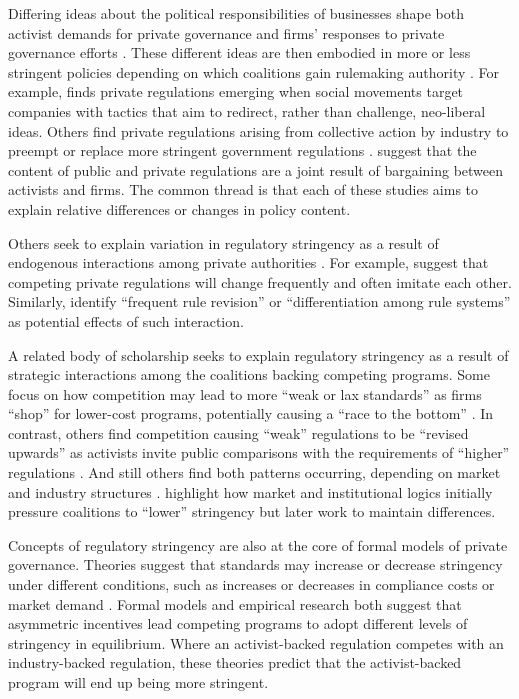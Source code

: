 \documentclass[
      12pt,
            Review ]{article}
\begin{document}
Differing ideas about the political responsibilities of businesses shape both activist demands for private governance and firms' responses to private governance efforts \citep{Bartley2003, Djelic2017}. These different ideas are then embodied in more or less stringent policies depending on which coalitions gain rulemaking authority \citep{Botzem2012, Hsueh2012}. For example, \citet{Bartley2003} finds private regulations emerging when social movements target companies with tactics that aim to redirect, rather than challenge, neo-liberal ideas. Others find private regulations arising from collective action by industry to preempt or replace more stringent government regulations \citep{Bartley2007, Cashore2002, Grabosky2013, Green2013, Loconto2014, Lyon2008, Maxwell2000, Prakash2000}. \citet{Abbott2009} suggest that the content of public and private regulations are a joint result of bargaining between activists and firms. The common thread is that each of these studies aims to explain relative differences or changes in policy content.

Others seek to explain variation in regulatory stringency as a result of endogenous interactions among private authorities \citep{DeLeon2009, Eberlein2014, Green2017, Gulbrandsen2014, Howard-Grenville2008, Li2015, Mills2016d}. For example, \citet{Smith2010} suggest that competing private regulations will change frequently and often imitate each other. Similarly, \citet{Eberlein2014} identify ``frequent rule revision'' or ``differentiation among rule systems'' as potential effects of such interaction.

A related body of scholarship seeks to explain regulatory stringency as a result of strategic interactions among the coalitions backing competing programs. Some focus on how competition may lead to more ``weak or lax standards'' as firms ``shop'' for lower-cost programs, potentially causing a ``race to the bottom'' \citep{Abbott2010, Fransen2011, Gulbrandsen2004}. In contrast, others find competition causing ``weak'' regulations to be ``revised upwards'' as activists invite public comparisons with the requirements of ``higher'' regulations \citep{Overdevest2005, Overdevest2010}. And still others find both patterns occurring, depending on market and industry structures \citep{Cashore2004, Hassel2008, VanderVen2015}. \citet{Cashore2004} highlight how market and institutional logics initially pressure coalitions to ``lower'' stringency but later work to maintain differences.

Concepts of regulatory stringency are also at the core of formal models of private governance. Theories suggest that standards may increase or decrease stringency under different conditions, such as increases or decreases in compliance costs or market demand \citep{Abderrazak2009, Fischer2014}. Formal models \citep{Fischer2014, Li2015, Poret2016} and empirical research \citep{Cashore2004} both suggest that asymmetric incentives lead competing programs to adopt different levels of stringency in equilibrium. Where an activist-backed regulation competes with an industry-backed regulation, these theories predict that the activist-backed program will end up being more stringent.
\end{document}
